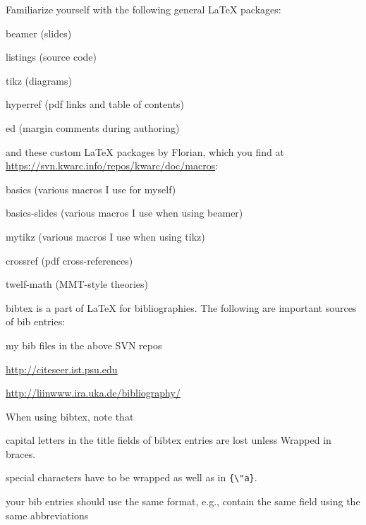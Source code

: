 \documentclass[12pt]{article}
\begin{document}
Familiarize yourself with the following general LaTeX packages:
\begin{compactitem}
\item beamer (slides)
\item listings (source code)
\item tikz (diagrams)
\item hyperref (pdf links and table of contents)
\item ed (margin comments during authoring)
\end{compactitem}
and these custom LaTeX packages by Florian, which you find at \url{https://svn.kwarc.info/repos/kwarc/doc/macros}:
\begin{compactitem}
\item basics (various macros I use for myself)
\item basics-slides (various macros I use when using beamer)
\item mytikz (various macros I use when using tikz)
\item crossref (pdf cross-references)
\item twelf-math (MMT-style theories)
\end{compactitem}
\medskip


bibtex is a part of LaTeX for bibliographies.
The following are important sources of bib entries:
\begin{compactitem}
\item my bib files in the above SVN repos
\item \url{http://citeseer.ist.psu.edu}
\item \url{http://liinwww.ira.uka.de/bibliography/}
\end{compactitem}
When using bibtex, note that
\begin{compactitem}
\item capital letters in the title fields of bibtex entries are lost unless {W}rapped in braces.
\item special characters have to be wrapped as well as in \verb|{\"a}|.
\item your bib entries should use the same format, e.g., contain the same field using the same abbreviations
\end{compactitem}

%
%
\end{document}
